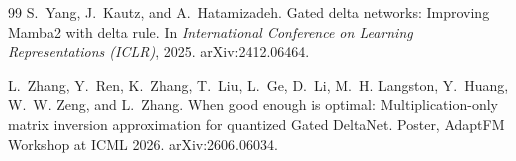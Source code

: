 \documentclass[11pt]{article}
\theoremstyle{remark}
\begin{document}
\begin{thebibliography}{99}
S.~Yang, J.~Kautz, and A.~Hatamizadeh.
\newblock Gated delta networks: Improving Mamba2 with delta rule.
\newblock In \emph{International Conference on Learning Representations (ICLR)}, 2025. arXiv:2412.06464.

L.~Zhang, Y.~Ren, K.~Zhang, T.~Liu, L.~Ge, D.~Li, M.~H. Langston, Y.~Huang, W.~W. Zeng, and L.~Zhang.
\newblock When good enough is optimal: Multiplication-only matrix inversion approximation for quantized Gated DeltaNet.
\newblock Poster, AdaptFM Workshop at ICML 2026. arXiv:2606.06034.

\end{thebibliography}
\end{document}
